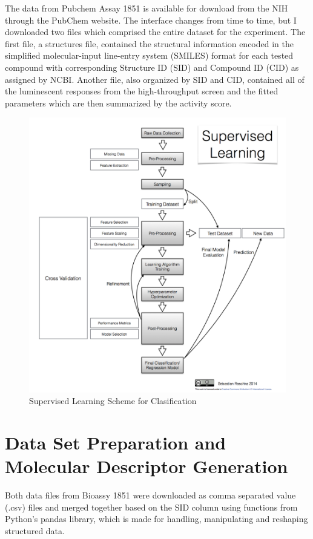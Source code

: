 The data from Pubchem Assay 1851 is available for download from the NIH through the PubChem website. The interface changes from time to time, but I downloaded two files which comprised the entire dataset for the experiment. The first file, a structures file, contained the structural information encoded in the simplified molecular-input line-entry system (SMILES) format for each tested compound with corresponding Structure ID (SID) and Compound ID (CID) as assigned by NCBI. Another file, also organized by SID and CID, contained all of the luminescent responses from the high-throughput screen and the fitted parameters which are then summarized by the activity score. 

\begin{figure}[!htbp]
  \caption{Supervised Learning Scheme for Clasification}
  \centering
  \includegraphics[width=1\textwidth]{../img/supervised_learning_flowchart.png}
\end{figure}


\section{Data Set Preparation and Molecular Descriptor Generation }

Both data files from Bioassy 1851 were downloaded as comma separated value (.csv) files and merged together based on the SID column using functions from Python's pandas library, which is made for handling, manipulating and reshaping structured data.

